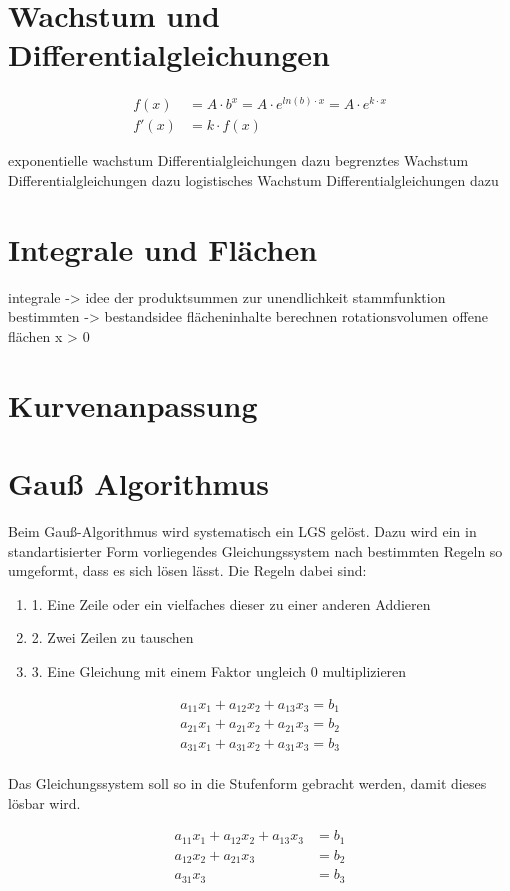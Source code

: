 \clearpage

\section{Wachstum und Differentialgleichungen}

\begin{align*}
    f(x) & = A \cdot b^x = A \cdot e^{ln(b) \cdot x} = A \cdot e^{k \cdot x} \\
    f'(x) & = k \cdot f(x)
\end{align*}

exponentielle wachstum
Differentialgleichungen dazu
begrenztes Wachstum
Differentialgleichungen dazu
logistisches Wachstum
Differentialgleichungen dazu

\section{Integrale und Flächen}

integrale -> idee der produktsummen zur unendlichkeit
stammfunktion bestimmten -> bestandsidee
flächeninhalte berechnen
rotationsvolumen
offene flächen
x > 0

\section{Kurvenanpassung}

\section{Gauß Algorithmus}

Beim Gauß-Algorithmus wird systematisch ein LGS gelöst.
Dazu wird ein in standartisierter Form vorliegendes Gleichungssystem
nach bestimmten Regeln so umgeformt, dass es sich lösen lässt.
Die Regeln dabei sind:

\begin{enumerate}
    \item 1. Eine Zeile oder ein vielfaches dieser zu einer anderen Addieren
    \item 2. Zwei Zeilen zu tauschen
    \item 3. Eine Gleichung mit einem Faktor ungleich 0 multiplizieren
\end{enumerate}

\begin{align*}
    a_{11}x_1 + a_{12}x_2 + a_{13}x_3 = b_1 \\
    a_{21}x_1 + a_{21}x_2 + a_{21}x_3 = b_2 \\
    a_{31}x_1 + a_{31}x_2 + a_{31}x_3 = b_3 \\
\end{align*}

Das Gleichungssystem soll so in die Stufenform gebracht werden, damit dieses lösbar wird.

\begin{align*}
    a_{11}x_1 + a_{12}x_2 + a_{13}x_3 & = b_1 \\
    a_{12}x_2 + a_{21}x_3 & = b_2 \\
    a_{31}x_3 & = b_3 \\
\end{align*}
